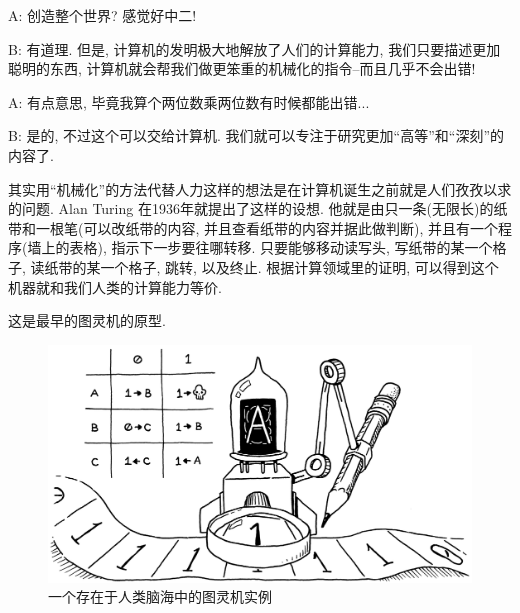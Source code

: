 \begin{dialogue}
	A: 创造整个世界? 感觉好中二! 
	
	B: 有道理. 但是, 计算机的发明极大地解放了人们的计算能力, 我们只要描述更加聪明的东西, 计算机就会帮我们做更笨重的机械化的指令--而且几乎不会出错! 
	
	A: 有点意思, 毕竟我算个两位数乘两位数有时候都能出错...
	
	B: 是的, 不过这个可以交给计算机. 我们就可以专注于研究更加``高等''和``深刻''的内容了. 
\end{dialogue}

其实用``机械化''的方法代替人力这样的想法是在计算机诞生之前就是人们孜孜以求的问题. Alan Turing 在1936年就提出了这样的设想. 他就是由只一条(无限长)的纸带和一根笔(可以改纸带的内容,
并且查看纸带的内容并据此做判断), 并且有一个程序(墙上的表格), 指示下一步要往哪转移. 只要能够移动读写头, 写纸带的某一个格子,
读纸带的某一个格子, 跳转, 以及终止.  根据计算领域里的证明, 可以得到这个机器就和我们人类的计算能力等价. 

这是最早的图灵机的原型. 

\begin{figure}
\centering
\includegraphics[scale=0.3]{1-python-plim/figs/turing-machine}	
\caption{一个存在于人类脑海中的图灵机实例}
\label{fig:trm}
\end{figure}


